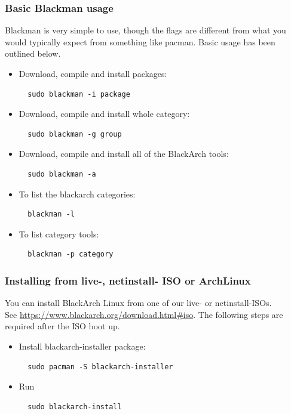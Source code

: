 \documentclass[a4paper, oneside,12pt]{scrartcl}
\begin{document}
\subsubsection{Basic Blackman usage} Blackman is very simple to use, though the flags are different from what you
would typically expect from something like pacman. Basic usage has been outlined below.
\begin{itemize}
\item Download, compile and install packages:
\begin{lstlisting}
  sudo blackman -i package
\end{lstlisting}

\item Download, compile and install whole category:
\begin{lstlisting}
  sudo blackman -g group
\end{lstlisting}

\item Download, compile and install all of the BlackArch tools:
\begin{lstlisting}
  sudo blackman -a
\end{lstlisting}

\item To list the blackarch categories:
\begin{lstlisting}
  blackman -l
\end{lstlisting}

\item To list category tools:
\begin{lstlisting}
  blackman -p category
\end{lstlisting}

\end{itemize}

\subsubsection{Installing from live-, netinstall- ISO or ArchLinux}
You can install BlackArch Linux from one of our live- or netinstall-ISOs.\\See
\url{https://www.blackarch.org/download.html#iso}. The following steps are
required after the ISO boot up.
\begin{itemize}
\item Install blackarch-installer package:
\begin{lstlisting}
  sudo pacman -S blackarch-installer
\end{lstlisting}

\item Run
\begin{lstlisting}
  sudo blackarch-install
\end{lstlisting}
\end{itemize}
\newpage
\end{document}
